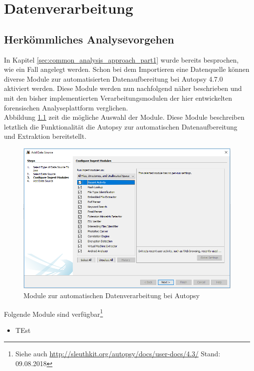 \chapter{Datenverarbeitung}
\label{ch:data_processing}

\section{Herkömmliches Analysevorgehen}
\label{sec:common_analysis_approach_part2}

In Kapitel \ref{sec:common_analysis_approach_part1} wurde bereits besprochen, wie ein Fall angelegt werden. Schon bei dem Importieren eine Datenquelle können diverse Module zur automatisierten Datenaufbereitung bei Autopsy 4.7.0 aktiviert werden. Diese Module werden nun nachfolgend näher beschrieben und mit den bisher implementierten Verarbeitungsmodulen der hier entwickelten forensischen Analyseplattform verglichen.\\

Abbildung \ref{fig:autopsy_2_ingest_modules} zeit die mögliche Auswahl der Module.
Diese Module beschreiben letztlich die Funktionalität die Autopsy zur automatischen Datenaufbereitung und Extraktion bereitstellt. 

\begin{figure}[ht]
  \centering
  \includegraphics[width=\textwidth]{./resource/autopsy_2_ingest_modules.png}
  \caption{Module zur automatischen Datenverarbeitung bei Autopsy}
  \label{fig:autopsy_2_ingest_modules}
\end{figure}

Folgende Module sind verfügbar\footnote{Siehe auch \url{http://sleuthkit.org/autopsy/docs/user-docs/4.3/} Stand: 09.08.2018}
\begin{itemize}
\item TEst
\end{itemize}

